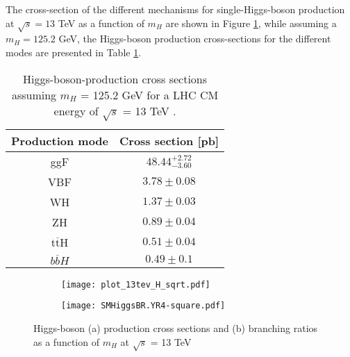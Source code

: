 \indent The cross-section of the different mechanisms for single-Higgs-boson production at $\sqrt{s} = 13$ TeV as a function of $m_H$ are shown in Figure \ref{fig:Higgs_cross_section}, while assuming a $m_H = 125.2$ GeV, the Higgs-boson production cross-sections for the different modes are presented in Table \ref{tab:Higgs_production}.
\begin{table}[H]
\small
\caption{Higgs-boson-production cross sections assuming $m_H$ = 125.2 GeV for a LHC CM energy of $\sqrt{s}$ = 13 TeV \cite{Higgs_production}.} 
\centering
\label{tab:Higgs_production}
\begin{tabular}{cc}
\hline
Production mode  & Cross section [pb]     \\ \hline
ggF              & $48.44^{+2.72}_{-3.60}$  \\ %
VBF              & $3.78\pm 0.08$   \\ %
WH               & $1.37\pm 0.03$   \\ %
ZH               & $0.89 \pm 0.04$ \\ %
t$\overline{\text{t}}$H & $0.51 \pm 0.04$  \\
$b\overline{b}H$ & $0.49 \pm 0.1$    %
\end{tabular}
\end{table}
\begin{figure}[H]
    \centering
    \begin{subfigure}{0.49\textwidth}
        \texttt{[image: plot\_13tev\_H\_sqrt.pdf]}
        \caption{}
        \label{fig:Higgs_cross_section}
    \end{subfigure}
    \begin{subfigure}{0.49\textwidth}
        \texttt{[image: SMHiggsBR.YR4-square.pdf]}
        \caption{}
        \label{fig:Higgs_BR}
    \end{subfigure}
    \caption{Higgs-boson (a) production cross sections and (b) branching ratios as a function of $m_H$ at $\sqrt{s}$ = 13 TeV \cite{Higgs_production}}
    \label{fig:Higgs_XS_BR}
\end{figure}



